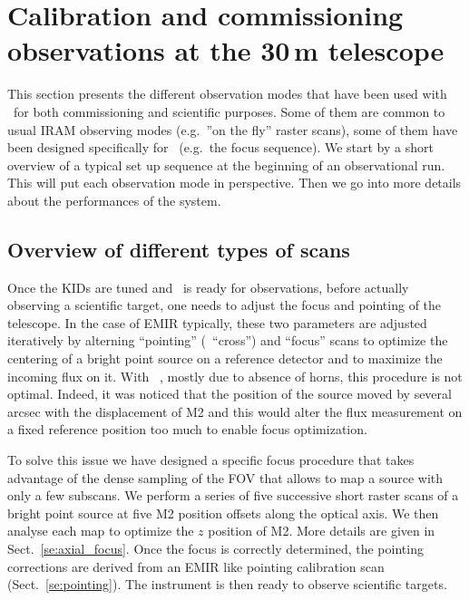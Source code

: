 
\section{Calibration and commissioning observations at the 30\,m telescope}%

This section presents the different observation modes that have been used with
\nika\ for both commissioning and scientific purposes. Some of them are common
to usual IRAM observing modes (e.g.~''on the fly'' raster scans), some of them
have been designed specifically for \nika\ (e.g.~the focus sequence). We start
by a short overview of a typical set up sequence at the beginning of
an observational run. This
will put each observation mode in perspective. Then we go into more details
about the performances of the system.

\subsection{Overview of different types of scans}

Once the KIDs are tuned and \nika\ is ready for observations, before actually
observing a scientific target, one needs to adjust the focus and pointing of the
telescope. In the case of EMIR typically, these two parameters are adjusted iteratively by
alterning ``pointing'' (\aka\ ``cross'') and ``focus'' scans to optimize the
centering of a bright point source on a reference detector and to maximize the
incoming flux on it. With \nika\ , mostly due to absence of horns, this
procedure is not optimal. Indeed, it was noticed that the position of the source
moved by several arcsec with the displacement of M2
 and this would alter the flux
measurement on a fixed reference position too much to enable focus
optimization.

To solve this issue we have designed a specific focus procedure that takes
advantage of the dense sampling of the FOV that allows to map a source with only
a few subscans. We perform a series of five successive short raster scans of a
bright point source at five M2 position offsets along the optical axis.%
We then analyse each map to optimize the $z$ position of M2. More details are given in
Sect.~\ref{se:axial_focus}.
Once the focus is correctly determined, the pointing
corrections are derived from an EMIR like pointing calibration scan
(Sect.~\ref{se:pointing}). The instrument is then ready to observe scientific
targets.

